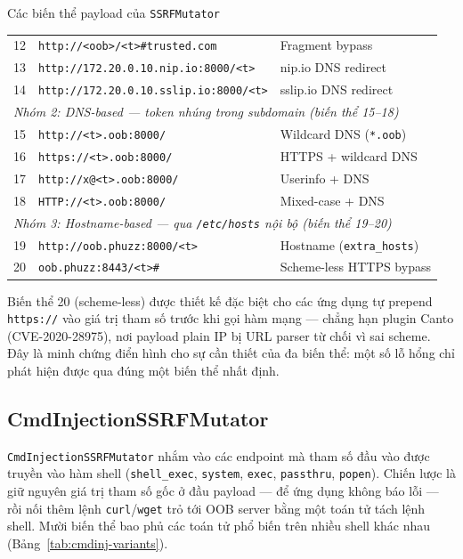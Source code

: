 \begin{table}[h]{Các biến thể payload của \texttt{SSRFMutator}}
\begin{tabular}{|c|p{8.5cm}|p{4.0cm}|}
12 & \texttt{http://<oob>/<t>\#trusted.com}             & Fragment bypass \\
13 & \texttt{http://172.20.0.10.nip.io:8000/<t>}        & nip.io DNS redirect \\
14 & \texttt{http://172.20.0.10.sslip.io:8000/<t>}      & sslip.io DNS redirect \\
\hline
\multicolumn{3}{|l|}{\textit{Nhóm 2: DNS-based — token nhúng trong subdomain (biến thể 15–18)}} \\
\hline
15 & \texttt{http://<t>.oob:8000/}                      & Wildcard DNS (\texttt{*.oob}) \\
16 & \texttt{https://<t>.oob:8000/}                     & HTTPS + wildcard DNS \\
17 & \texttt{http://x@<t>.oob:8000/}                    & Userinfo + DNS \\
18 & \texttt{HTTP://<t>.oob:8000/}                      & Mixed-case + DNS \\
\hline
\multicolumn{3}{|l|}{\textit{Nhóm 3: Hostname-based — qua \texttt{/etc/hosts} nội bộ (biến thể 19–20)}} \\
\hline
19 & \texttt{http://oob.phuzz:8000/<t>}                 & Hostname (\texttt{extra\_hosts}) \\
20 & \texttt{oob.phuzz:8443/<t>\#}                      & Scheme-less HTTPS bypass \\
\hline
\end{tabular}
\end{table}

Biến thể 20 (scheme-less) được thiết kế đặc biệt cho các ứng dụng tự
prepend \texttt{https://} vào giá trị tham số trước khi gọi hàm mạng
--- chẳng hạn plugin Canto (\mbox{CVE-2020-28975}), nơi payload plain IP
bị URL parser từ chối vì sai scheme. Đây là minh chứng điển hình cho
sự cần thiết của đa biến thể: một số lỗ hổng chỉ phát hiện được qua
đúng một biến thể nhất định.

\subsection{CmdInjectionSSRFMutator}

\texttt{CmdInjectionSSRFMutator} nhắm vào các endpoint mà tham số đầu
vào được truyền vào hàm shell (\texttt{shell\_exec}, \texttt{system},
\texttt{exec}, \texttt{passthru}, \texttt{popen}). Chiến lược là giữ
nguyên giá trị tham số gốc ở đầu payload --- để ứng dụng không báo lỗi
--- rồi nối thêm lệnh \texttt{curl}/\texttt{wget} trỏ tới OOB server
bằng một toán tử tách lệnh shell. Mười biến thể bao phủ các toán tử
phổ biến trên nhiều shell khác nhau (Bảng~\ref{tab:cmdinj-variants}).

